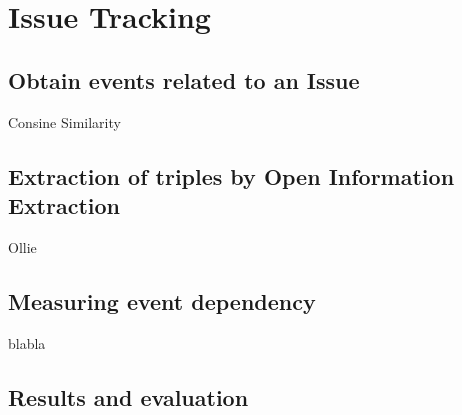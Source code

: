 \section{Issue Tracking}
\subsection{Obtain events related to an Issue}
Consine Similarity
\subsection{Extraction of triples by Open Information Extraction}
Ollie
\subsection{Measuring event dependency}
blabla
\subsection{Results and evaluation}
